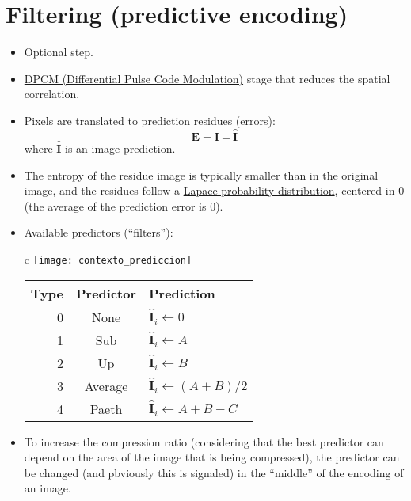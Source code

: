 \section{Filtering (predictive encoding)}
\begin{itemize}
\item Optional step.
\item
  \href{https://en.wikipedia.org/wiki/Differential_pulse-code_modulation}{DPCM
    (Differential Pulse Code Modulation)} stage that reduces the
  spatial correlation.
\item Pixels are translated to prediction residues (errors):
  \begin{equation*}
    {\mathbf E} = {\mathbf I} - \hat{\mathbf I}
  \end{equation*}
  where $\hat{\mathbf I}$ is an image prediction.
\item The entropy of the residue image is typically smaller than in
  the original image, and the residues follow a
  \href{https://en.wikipedia.org/wiki/Laplace_distribution}{Lapace
    probability distribution}, centered in 0 (the average of the
  prediction error is 0).
\item Available predictors (``filters''):
  \begin{center}
    \begin{tabular}{c}
      \texttt{[image: contexto\_prediccion]} \\
      \begin{tabular}{rcl}
        Type & Predictor & Prediction \\
        \hline
        0 &	None 	& $\hat{\mathbf I}_i\leftarrow 0$ \\
        1 &	Sub 	& $\hat{\mathbf I}_i\leftarrow A$ \\
        2 &	Up 	& $\hat{\mathbf I}_i\leftarrow B$ \\
        3 &	Average & $\hat{\mathbf I}_i\leftarrow (A+B)/2$ \\
        4 &	Paeth 	& $\hat{\mathbf I}_i\leftarrow A + B - C$
      \end{tabular}
    \end{tabular}
  \end{center}
\item To increase the compression ratio (considering that the best
  predictor can depend on the area of the image that is being
  compressed), the predictor can be changed (and pbviously this is
  signaled) in the ``middle'' of the encoding of an image.
\end{itemize}

